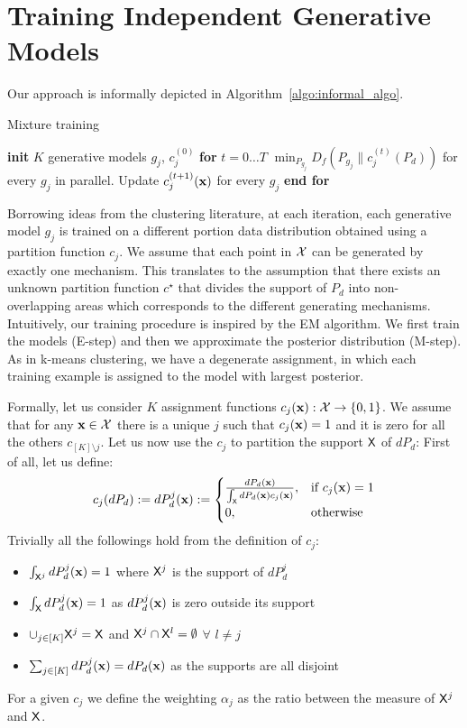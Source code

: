 \documentclass{article}
\newcommand{\Pd}{P_{d}}
\begin{document}
\section{Training Independent Generative Models}
Our approach is informally depicted in Algorithm~\ref{algo:informal_algo}.
\begin{algorithm}[h]
  \caption{Mixture training}
  \label{algo:informal_algo}
\begin{algorithmic}[1]
  \STATE \textbf{init} $K$ generative models $g_j$, $c^{(0)}_j$
  \STATE \textbf{for} {$t=0\dots T$}
  \STATE \qquad  $\min_{P_{g_j}} D_f\left(P_{g_j}\|c^{(t)}_j(\Pd)\right)$ for every $g_j$ in parallel.
  \STATE \qquad Update $c_j^{(t+1)}({\mathbf{x}})$ for every $g_j$
  \STATE \textbf{end for}
\end{algorithmic}
\end{algorithm}
Borrowing ideas from the clustering literature, at each iteration, each generative model $g_j$ is trained on a different portion data distribution obtained using a partition function $c_j$. 
We assume that each point in $\mathcal{X}$ can be generated by exactly one mechanism. 
This translates to the assumption that there exists an unknown partition function $c^\star$ that divides the support of $\Pd$ into non-overlapping areas which corresponds to the different generating mechanisms. 
Intuitively, our training procedure is inspired by the EM algorithm. We first train the models (E-step) and then we approximate the posterior distribution (M-step). As in k-means clustering, we have a degenerate assignment, in which each training example is assigned to the model with largest posterior.

Formally, let us consider $K$ assignment functions $c_j({\mathbf{x}}): \mathcal{X} \rightarrow \left\lbrace 0,1\right\rbrace$.
We assume that for any ${\mathbf{x}}\in\mathcal{X}$ there is a unique $j$ such that $c_j({\mathbf{x}}) = 1$ and it is zero for all the others $c_{[K]\setminus j}$.
Let us now use the $c_j$ to partition the support $\mathsf{X}$ of $d\Pd$:
First of all, let us define:
\begin{align*}
c_j(d\Pd) := d\Pd^j (\bx) := \begin{cases} \frac{d\Pd (\bx)}{\int_\sfX d\Pd (\bx)c_j(\bx)}, & \mbox{if } c_j(\bx) = 1 \\ 0, & \mbox{otherwise }\end{cases}
\end{align*}
Trivially all the followings hold from the definition of $c_j$:
\begin{itemize}
\item $\int_{\sfX^j} d\Pd^j (\bx) = 1$ where $\mathsf{X}^j$ is the support of $d\Pd^j$
\item $\int_\sfX d\Pd^j (\bx) = 1$ as $d\Pd^j (\bx)$ is zero outside its support
\item $\cup_{j\in [K]} \mathsf{X}^j = \mathsf{X}$ and $\mathsf{X}^j \cap \mathsf{X}^{l}  = \emptyset$ $\forall$ $l\neq j$
\item $\sum_{j\in [K]} d\Pd^j (\bx) = d\Pd (\bx)$ as the supports are all disjoint
\end{itemize}
For a given $c_j$ we define the weighting $\alpha_j$ as the ratio between the measure of $\mathsf{X}^j$ and $\mathsf{X}$. 
\end{document}
